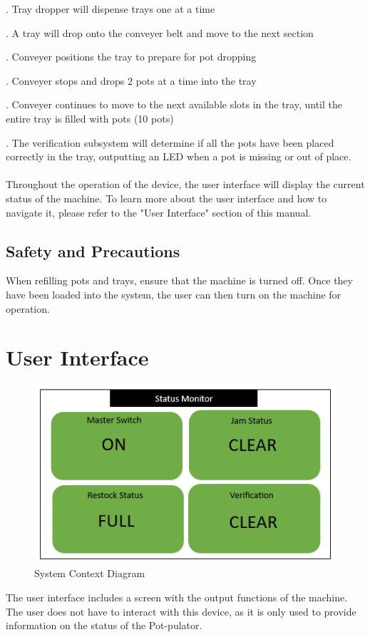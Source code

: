 \documentclass{article}
\begin{document}
 .	Tray dropper will dispense trays one at a time

 .	A tray will drop onto the conveyer belt and move to the next section

 .	Conveyer positions the tray to prepare for pot dropping

 .	Conveyer stops and drops 2 pots at a time into the tray

 .	Conveyer continues to move to the next available slots in the tray, until the entire tray is filled with pots (10 pots)

 .	The verification subsystem will determine if all the pots have been placed correctly in the tray, outputting an LED when a pot is missing or out of place. 
\\
\\ \noindent Throughout the operation of the device, the user interface will display the current status of the machine. To learn more about the user interface and how to navigate it, please refer to the "User Interface" section of this manual.
\subsection{Safety and Precautions}
When refilling pots and trays, ensure that the machine is turned off. Once they have been loaded into the system, the user can then turn on the machine for operation.
\section{User Interface}
\begin{figure}[H]
    \includegraphics{statusgood.png}
    \caption{System Context Diagram}
    \label{fig:scope}
  \end{figure}
The user interface includes a screen with the output functions of the machine. The user does not have to interact with this device, as it is only used to provide information on the status of the Pot-pulator.
\end{document}
